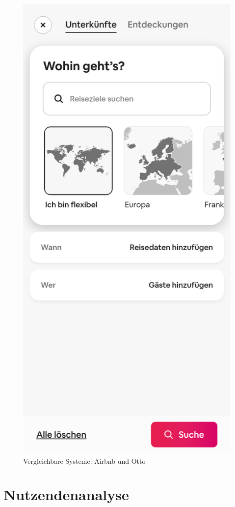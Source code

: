 \begin{figure}[h]
        \includegraphics[scale=0.1]{Bilder/Arbnbnsuche.png}
        \caption{Vergleichbare Systeme: Airbnb und Otto}\label{fig:system}
\end{figure}
\section{Nutzendenanalyse}

